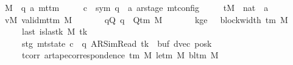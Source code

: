 \begin{isabellebody}
\ \ \ M\ {\isacharcolon}{\kern0pt}{\isacharcolon}{\kern0pt}\ {\isachardoublequoteopen}{\isacharparenleft}{\kern0pt}{\isacharprime}{\kern0pt}q{\isacharcomma}{\kern0pt}\ {\isacharprime}{\kern0pt}a{\isacharparenright}{\kern0pt}\ mttm{\isachardoublequoteclose}\isanewline
\ \ \ \ \ c{\isacharprime}{\kern0pt}\ {\isacharcolon}{\kern0pt}{\isacharcolon}{\kern0pt}\ {\isachardoublequoteopen}{\isacharparenleft}{\kern0pt}sym{}{\isacharcomma}{\kern0pt}\ {\isacharprime}{\kern0pt}q\ {\isasymtimes}\ {\isacharprime}{\kern0pt}a\ ar{\isacharunderscore}{\kern0pt}stage{\isacharparenright}{\kern0pt}\ mt{\isacharunderscore}{\kern0pt}config{\isachardoublequoteclose}\isanewline
\ \ \ \ \ tM\ {\isacharcolon}{\kern0pt}{\isacharcolon}{\kern0pt}\ {\isachardoublequoteopen}nat\ {\isasymRightarrow}\ {\isacharprime}{\kern0pt}a{\isachardoublequoteclose}\isanewline
\ \ \ vM{\isacharcolon}{\kern0pt}\ {\isachardoublequoteopen}valid{\isacharunderscore}{\kern0pt}mttm\ M{\isachardoublequoteclose}\isanewline
\ \ \ \ \ \ \ qQ{\isacharcolon}{\kern0pt}\ {\isachardoublequoteopen}q\ {\isasymin}\ Q{\isacharunderscore}{\kern0pt}tm\ M{\isachardoublequoteclose}\isanewline
\ \ \ \ \ \ \ kge{}{\isacharcolon}{\kern0pt}\ {\isachardoublequoteopen}{}\ {\isasymle}\ block{\isacharunderscore}{\kern0pt}width\ {\isacharparenleft}{\kern0pt}{\isasymGamma}{\isacharunderscore}{\kern0pt}tm\ M{\isacharparenright}{\kern0pt}{\isachardoublequoteclose}\isanewline
\ \ \ \ \ \ \ last{\isacharcolon}{\kern0pt}\ {\isachardoublequoteopen}is{\isacharunderscore}{\kern0pt}last{\isacharunderscore}{\kern0pt}k\ M\ tk{\isachardoublequoteclose}\isanewline
\ \ \ \ \ \ \ stg{\isacharcolon}{\kern0pt}\ {\isachardoublequoteopen}mt{\isacharunderscore}{\kern0pt}state\ c{\isacharprime}{\kern0pt}\ {\isacharequal}{\kern0pt}\ {\isacharparenleft}{\kern0pt}q{\isacharcomma}{\kern0pt}\ AR{\isacharunderscore}{\kern0pt}SimRead{\isacharcomma}{\kern0pt}\ tk{\isacharcomma}{\kern0pt}\ {}{\isacharcomma}{\kern0pt}\ buf{\isacharcomma}{\kern0pt}\ dvec{\isacharcomma}{\kern0pt}\ posk{\isacharparenright}{\kern0pt}{\isachardoublequoteclose}\isanewline
\ \ \ \ \ \ \ tcorr{\isacharcolon}{\kern0pt}\ {\isachardoublequoteopen}ar{\isacharunderscore}{\kern0pt}tape{\isacharunderscore}{\kern0pt}correspondence\ {\isacharparenleft}{\kern0pt}{\isasymGamma}{\isacharunderscore}{\kern0pt}tm\ M{\isacharparenright}{\kern0pt}\ {\isacharparenleft}{\kern0pt}le{\isacharunderscore}{\kern0pt}tm\ M{\isacharparenright}{\kern0pt}\ {\isacharparenleft}{\kern0pt}bl{\isacharunderscore}{\kern0pt}tm\ M{\isacharparenright}{\kern0pt}\isanewline

\end{isabellebody}
